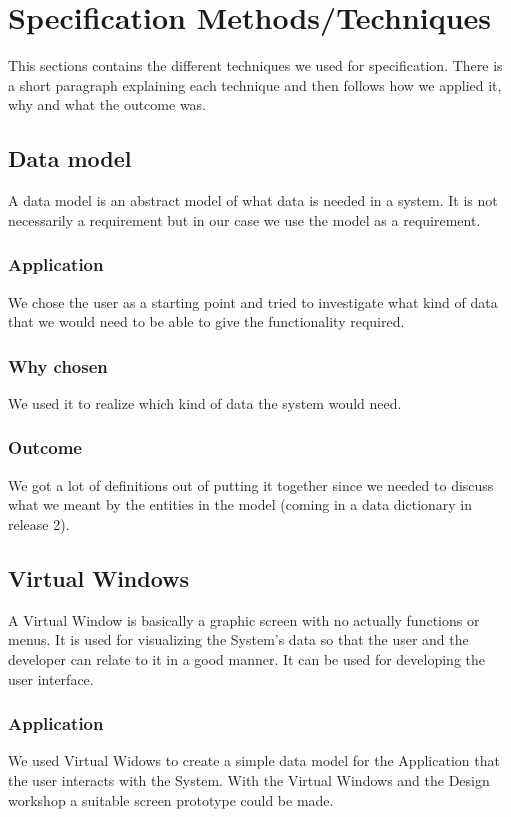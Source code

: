 \documentclass[a4paper]{article}
\begin{document}
	\section{Specification Methods/Techniques}
This sections contains the different techniques we used for specification. There is a short paragraph explaining each technique and then follows how we applied it, why and what the outcome was.

		\subsection{Data model}
A data model is an abstract model of what data is needed in a system. It is not necessarily a requirement but in our case we use the model as a requirement.
	
		\subsubsection{Application}
		We chose the user as a starting point and tried to investigate what kind of data that we would need to be able to give the functionality required.
		\subsubsection{Why chosen}
		We used it to realize which kind of data the system would need.
		\subsubsection{Outcome}
	We got a lot of definitions out of putting it together since we needed to discuss what we meant by the entities in the model (coming in a data dictionary in release 2).

		\subsection{Virtual Windows}
			A Virtual Window is basically a graphic screen with no actually functions or menus. It is used for visualizing the System's data so that the user and the developer can relate to it in a good manner. It can be used for developing the user interface.
			\subsubsection{Application}
				We used Virtual Widows to create a simple data model for the Application that the user interacts with the System. With the Virtual Windows and the Design workshop a suitable screen prototype could be made.
\end{document}
